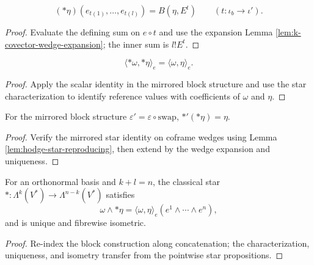 \begin{lemma}
\label{lem:hodge-star-reproducing}
\leanok
{}
\[
({*}\eta)(e_{t(1)},\ldots,e_{t(l)})=B(\eta,E^t)\qquad(t:\iota_b\to\iota').
\]
\end{lemma}
\begin{proof}
\leanok
\sketch Evaluate the defining sum on $e\circ t$ and use the expansion Lemma \ref{lem:k-covector-wedge-expansion}; the inner sum is $l!E^t$.
\end{proof}

\begin{proposition}
\label{prop:hodge-star-isometry}
\leanok
{}
\[
\langle {*}\omega,{*}\eta\rangle_e=\langle\omega,\eta\rangle_e.
\]
\end{proposition}
\begin{proof}
\leanok
\sketch Apply the scalar identity in the mirrored block structure and use the star characterization to identify reference values with coefficients of $\omega$ and $\eta$.
\end{proof}

\begin{proposition}
\label{prop:hodge-star-involution}
\leanok
{}
For the mirrored block structure $\varepsilon'=\varepsilon\circ\mathrm{swap}$, $*'(*\eta)=\eta$.
\end{proposition}
\begin{proof}
\leanok
\sketch Verify the mirrored star identity on coframe wedges using Lemma \ref{lem:hodge-star-reproducing}, then extend by the wedge expansion and uniqueness.
\end{proof}

\begin{proposition}
\label{prop:hodge-star-graded}
\leanok
{}
For an orthonormal basis and $k+l=n$, the classical star $*:\Lambda^k(V^*)\to\Lambda^{n-k}(V^*)$ satisfies
\[
\omega\wedge {*}\eta=\langle\omega,\eta\rangle_e(e^1\wedge\cdots\wedge e^n),
\]
and is unique and fibrewise isometric.
\end{proposition}
\begin{proof}
\leanok
\sketch Re-index the block construction along concatenation; the characterization, uniqueness, and isometry transfer from the pointwise star propositions.
\end{proof}

